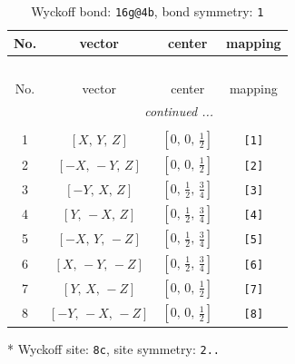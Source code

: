 \documentclass[fleqn,8pt]{jsarticle}
\begin{document}
\begin{longtable}{cccc}
\caption{Wyckoff bond: {\tt 16g@4b}, bond symmetry: {\tt 1}}
 \\
 \hline \hline
No. & vector & center & mapping \\ \hline \endfirsthead

\multicolumn{3}{l}{\tablename\ \thetable{}} \\
 \hline \hline
No. & vector & center & mapping \\ \hline \endhead

 \hline \hline
\multicolumn{3}{r}{\footnotesize\it continued ...} \\ \endfoot

 \hline \hline
\multicolumn{3}{r}{} \\ \endlastfoot

1 & $\left[ X,\, Y,\, Z \right]$ & $\left[ 0,\, 0,\, \frac{1}{2} \right]$ & {\tt [1]} \\ \hline
2 & $\left[ - X,\, - Y,\, Z \right]$ & $\left[ 0,\, 0,\, \frac{1}{2} \right]$ & {\tt [2]} \\ \hline
3 & $\left[ - Y,\, X,\, Z \right]$ & $\left[ 0,\, \frac{1}{2},\, \frac{3}{4} \right]$ & {\tt [3]} \\ \hline
4 & $\left[ Y,\, - X,\, Z \right]$ & $\left[ 0,\, \frac{1}{2},\, \frac{3}{4} \right]$ & {\tt [4]} \\ \hline
5 & $\left[ - X,\, Y,\, - Z \right]$ & $\left[ 0,\, \frac{1}{2},\, \frac{3}{4} \right]$ & {\tt [5]} \\ \hline
6 & $\left[ X,\, - Y,\, - Z \right]$ & $\left[ 0,\, \frac{1}{2},\, \frac{3}{4} \right]$ & {\tt [6]} \\ \hline
7 & $\left[ Y,\, X,\, - Z \right]$ & $\left[ 0,\, 0,\, \frac{1}{2} \right]$ & {\tt [7]} \\ \hline
8 & $\left[ - Y,\, - X,\, - Z \right]$ & $\left[ 0,\, 0,\, \frac{1}{2} \right]$ & {\tt [8]} \\
\end{longtable}
* Wyckoff site: {\tt 8c}, site symmetry: {\tt 2..}
\renewcommand{\arraystretch}{1.2}
\end{document}
